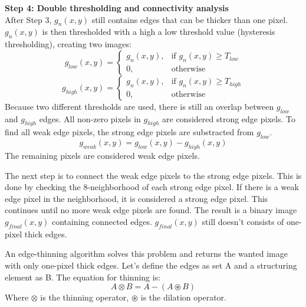   

\textbf{Step 4: Double thresholding and connectivity analysis} \\
After Step 3, $g_n(x,y)$ still contains edges that can be thicker than one pixel. $g_n(x,y)$ is then thresholded with a high a low threshold value (hysteresis thresholding), creating two images: 
\begin{equation}
    g_{low}(x,y) = \begin{cases}
    g_n(x,y), & \text{if } g_n(x,y) \geq T_{low} \\
    0, &\text{otherwise}
\end{cases}
\end{equation}
\begin{equation}
    g_{high}(x,y) = \begin{cases}
    g_n(x,y), & \text{if } g_n(x,y) \geq T_{high} \\
    0, &\text{otherwise}
\end{cases}
\end{equation}
Because two different thresholds are used, there is still an overlap between $g_{low}$ and $g_{high}$ edges. All non-zero pixels in $g_{high}$ are considered strong edge pixels. To find all weak edge pixels, the strong edge pixels are substracted from $g_{low}$. 
\begin{equation}
    g_{weak}(x,y) = g_{low}(x,y) - g_{high}(x,y)
\end{equation}
The remaining pixels are considered weak edge pixels.

The next step is to connect the weak edge pixels to the strong edge pixels. This is done by checking the 8-neighborhood of each strong edge pixel. If there is a weak edge pixel in the neighborhood, it is considered a strong edge pixel. This continues until no more weak edge pixels are found. The result is a binary image $g_{final}(x,y)$ containing connected edges. $g_{final}(x,y)$ still doesn't consists of one-pixel thick edges. 

An edge-thinning algorithm solves this problem and returns the wanted image with only one-pixel thick edges. Let's define the edges as set A and a structuring element as B. 
The equation for thinning is: 
\begin{equation}
    A \otimes   B = A - (A \circledast B)
\end{equation}
Where $\otimes$ is the thinning operator, $\circledast$ is the dilation operator.

